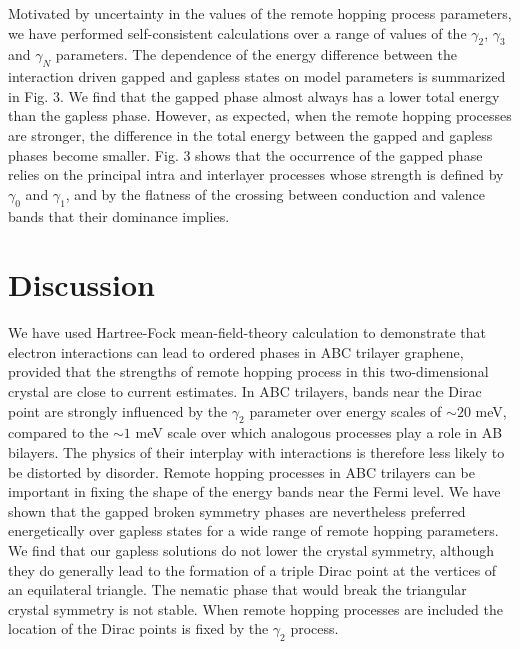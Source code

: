 \documentclass[twocolumn,prb,showpacs,preprintnumbers,amsmath,amssymb]{revtex4}
\begin{document}
Motivated by uncertainty in the values of the remote hopping process 
parameters, we have performed self-consistent calculations 
over a range of values of the $\gamma_2$, 
$\gamma_3$ and $\gamma_N$ parameters.
The dependence of the energy difference between the interaction driven 
gapped and gapless states on model parameters is summarized in 
Fig. 3.  We find that the gapped phase almost always has a lower total energy
than the gapless phase. However, as expected, when the
remote hopping processes are stronger,  
the difference in the total energy between the gapped and gapless phases
become smaller.  Fig. 3 shows that the occurrence of the gapped phase relies on the 
principal intra and interlayer processes whose strength is defined by 
$\gamma_0$ and $\gamma_1$, and by the flatness of the
crossing between conduction and valence bands that their dominance implies.  


\section{Discussion}

We have used Hartree-Fock mean-field-theory calculation 
to demonstrate that electron interactions can lead to ordered 
phases in ABC trilayer graphene, provided that the strengths of 
remote hopping process in this two-dimensional crystal are close 
to current estimates.
In ABC trilayers, bands near the Dirac point are strongly influenced 
by the $\gamma_2$ parameter over energy scales of $\sim 20$ meV,
compared to the $\sim 1$ meV scale over which analogous processes
play a role in AB bilayers.  The physics of their interplay with interactions 
is therefore less likely to be distorted by disorder.
Remote hopping processes in ABC trilayers
can be important in fixing the shape of the energy bands near the Fermi level.  We have shown that the 
gapped broken symmetry phases are nevertheless 
preferred energetically over gapless states
for a wide range of remote hopping parameters. 
We find that our gapless solutions do not lower the crystal symmetry,
although they do generally lead to the formation of a triple Dirac point at the vertices of an equilateral
triangle.  The nematic phase that would break the triangular crystal symmetry
is not stable.
When remote hopping processes are included the location 
of the Dirac points is fixed by the $\gamma_2$ process.
\end{document}
